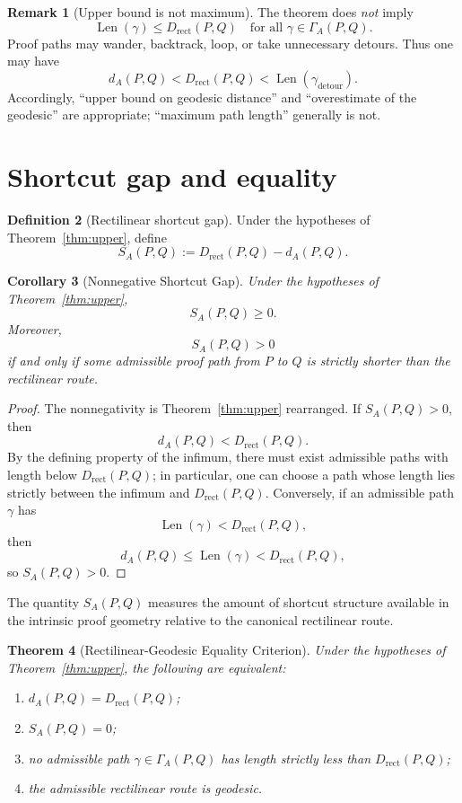 \documentclass[11pt]{article}
\newtheorem{theorem}{Theorem}[section]
\newtheorem{corollary}[theorem]{Corollary}
\theoremstyle{definition}
\newtheorem{definition}[theorem]{Definition}
\newtheorem{remark}[theorem]{Remark}
\newcommand{\Drect}{D_{\mathrm{rect}}}
\newcommand{\len}{\operatorname{Len}}
\newcommand{\distA}{d_A}
\begin{document}
\begin{remark}[Upper bound is not maximum]
The theorem does \emph{not} imply
\[
\len(\gamma)\le\Drect(P,Q)
\quad\text{for all }\gamma\in\Gamma_A(P,Q).
\]
Proof paths may wander, backtrack, loop, or take unnecessary detours.  Thus one may have
\[
\distA(P,Q)
<
\Drect(P,Q)
<
\len(\gamma_{\mathrm{detour}}).
\]
Accordingly, ``upper bound on geodesic distance'' and ``overestimate of the geodesic'' are appropriate; ``maximum path length'' generally is not.
\end{remark}

\section{Shortcut gap and equality}

\begin{definition}[Rectilinear shortcut gap]
Under the hypotheses of Theorem~\ref{thm:upper}, define
\[
\boxed{
S_A(P,Q)
:=
\Drect(P,Q)-\distA(P,Q).
}
\]
\end{definition}

\begin{corollary}[Nonnegative Shortcut Gap]\label{cor:gap}
Under the hypotheses of Theorem~\ref{thm:upper},
\[
\boxed{S_A(P,Q)\ge0.}
\]
Moreover,
\[
S_A(P,Q)>0
\]
if and only if some admissible proof path from $P$ to $Q$ is strictly shorter than the rectilinear route.
\end{corollary}

\begin{proof}
The nonnegativity is Theorem~\ref{thm:upper} rearranged.  If $S_A(P,Q)>0$, then
\[
\distA(P,Q)<\Drect(P,Q).
\]
By the defining property of the infimum, there must exist admissible paths with length below $\Drect(P,Q)$; in particular, one can choose a path whose length lies strictly between the infimum and $\Drect(P,Q)$.  Conversely, if an admissible path $\gamma$ has
\[
\len(\gamma)<\Drect(P,Q),
\]
then
\[
\distA(P,Q)\le\len(\gamma)<\Drect(P,Q),
\]
so $S_A(P,Q)>0$.
\end{proof}

The quantity $S_A(P,Q)$ measures the amount of shortcut structure available in the intrinsic proof geometry relative to the canonical rectilinear route.

\begin{theorem}[Rectilinear-Geodesic Equality Criterion]\label{thm:eqcrit}
Under the hypotheses of Theorem~\ref{thm:upper}, the following are equivalent:
\begin{enumerate}[label=(\roman*)]
\item $\distA(P,Q)=\Drect(P,Q)$;
\item $S_A(P,Q)=0$;
\item no admissible path $\gamma\in\Gamma_A(P,Q)$ has length strictly less than $\Drect(P,Q)$;
\item the admissible rectilinear route is geodesic.
\end{enumerate}
\end{theorem}
\end{document}
